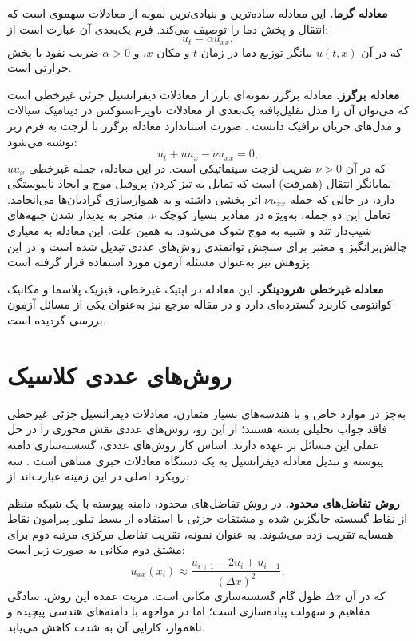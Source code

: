 \textbf{معادله گرما.} این معادله ساده‌ترین و بنیادی‌ترین نمونه از معادلات سهموی است که انتقال و پخش دما را توصیف می‌کند. فرم یک‌بعدی آن عبارت است از:
\begin{equation}
u_t = \alpha u_{xx},
\label{eq:heat}
\end{equation}
که در آن $u(t,x)$ بیانگر توزیع دما در زمان $t$ و مکان $x$، و $\alpha > 0$ ضریب نفوذ یا پخش حرارتی است.

\textbf{معادله برگرز.} معادله برگرز نمونه‌ای بارز از معادلات دیفرانسیل جزئی غیرخطی است که می‌توان آن را مدل تقلیل‌یافته یک‌بعدی از معادلات ناویر-استوکس در دینامیک سیالات و مدل‌های جریان ترافیک دانست \cite{hopf1950}. صورت استاندارد معادله برگرز با لزجت به فرم زیر نوشته می‌شود:
\begin{equation}
u_t + u u_x - \nu u_{xx} = 0,
\label{eq:burgers-intro}
\end{equation}
که در آن $\nu > 0$ ضریب لزجت سینماتیکی است. در این معادله، جمله غیرخطی $u u_x$ نمایانگر انتقال (همرفت) است که تمایل به تیز کردن پروفیل موج و ایجاد ناپیوستگی دارد، در حالی که جمله $\nu u_{xx}$ اثر پخشی داشته و به هموارسازی گرادیان‌ها می‌انجامد. تعامل این دو جمله، به‌ویژه در مقادیر بسیار کوچک $\nu$، منجر به پدیدار شدن جبهه‌های شیب‌دار تند و شبیه به موج شوک می‌شود. به همین علت، این معادله به معیاری چالش‌برانگیز و معتبر برای سنجش توانمندی روش‌های عددی تبدیل شده است و در این پژوهش نیز به‌عنوان مسئله آزمون مورد استفاده قرار گرفته است.

\textbf{معادله غیرخطی شرودینگر.} این معادله در اپتیک غیرخطی، فیزیک پلاسما و مکانیک کوانتومی کاربرد گسترده‌ای دارد و در مقاله مرجع \cite{raissi2019} نیز به‌عنوان یکی از مسائل آزمون بررسی گردیده است.

\section{روش‌های عددی کلاسیک}
\label{sec:classical}

به‌جز در موارد خاص و با هندسه‌های بسیار متقارن، معادلات دیفرانسیل جزئی غیرخطی فاقد جواب تحلیلی بسته هستند؛ از این رو، روش‌های عددی نقش محوری را در حل عملی این مسائل بر عهده دارند. اساس کار روش‌های عددی، گسسته‌سازی دامنه پیوسته و تبدیل معادله دیفرانسیل به یک دستگاه معادلات جبری متناهی است \cite{leveque2007}. سه رویکرد اصلی در این زمینه عبارت‌اند از:

\textbf{روش تفاضل‌های محدود.} در روش تفاضل‌های محدود، دامنه پیوسته با یک شبکه منظم از نقاط گسسته جایگزین شده و مشتقات جزئی با استفاده از بسط تیلور پیرامون نقاط همسایه تقریب زده می‌شوند. به عنوان نمونه، تقریب تفاضل مرکزی مرتبه دوم برای مشتق دوم مکانی به صورت زیر است:
\begin{equation}
u_{xx}(x_i) \approx \frac{u_{i+1} - 2u_i + u_{i-1}}{(\Delta x)^2},
\label{eq:fd}
\end{equation}
که در آن $\Delta x$ طول گام گسسته‌سازی مکانی است. مزیت عمده این روش، سادگی مفاهیم و سهولت پیاده‌سازی است؛ اما در مواجهه با دامنه‌های هندسی پیچیده و ناهموار، کارایی آن به شدت کاهش می‌یابد.

